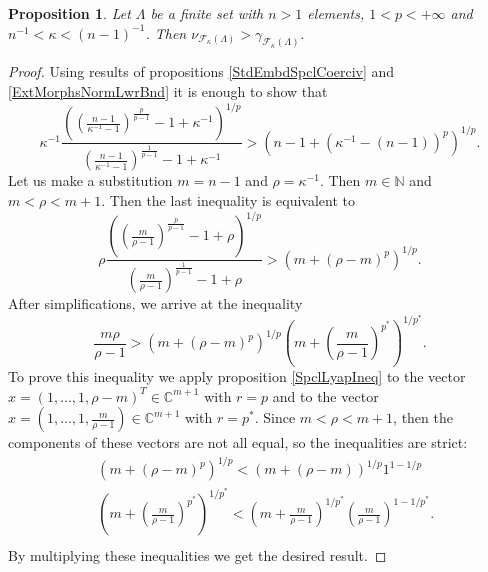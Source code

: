 \documentclass[12pt]{article}
\newtheorem{proposition}[theorem]{Proposition}
\begin{document}
\begin{proposition}\label{CompStdEmbdCoercvAndExtMorphsNormInf}
    Let $\Lambda$ be a finite set with $n>1$ elements, $1<p<+\infty$ 
    and $n^{-1}<\kappa<(n-1)^{-1}$. Then
    $
    \nu_{\mathcal{F}_{\kappa}(\Lambda)}
    >
    \gamma_{\mathcal{F}_{\kappa}(\Lambda)}.
    $
\end{proposition}
\begin{proof}
    Using results of propositions \ref{StdEmbdSpclCoerciv} 
    and \ref{ExtMorphsNormLwrBnd} it is enough to show that
    \[
        \kappa^{-1}
        \frac{
            \left(
                \left(\frac{n-1}{\kappa^{-1}-1}
                \right)^{\frac{p}{p-1}}
                -1+\kappa^{-1}
            \right)^{1/p}
        }{
            \left(\frac{n-1}{\kappa^{-1}-1}
            \right)^{\frac{1}{p-1}}
            -1+\kappa^{-1}
        }
        >
        (n-1+(\kappa^{-1}-(n-1))^p)^{1/p}.
    \]
    Let us make a substitution $m=n-1$ and $\rho=\kappa^{-1}$. 
    Then $m\in\mathbb{N}$ and $m<\rho<m+1$. Then the last inequality is 
    equivalent to
    \[
        \rho
        \frac{
            \left(
                \left(\frac{m}{\rho-1}
                \right)^{\frac{p}{p-1}}
                -1+\rho
            \right)^{1/p}
        }{
            \left(\frac{m}{\rho-1}
            \right)^{\frac{1}{p-1}}
            -1+\rho
        }
        >
        (m+(\rho-m)^p)^{1/p}.
    \] 
    After simplifications, we arrive at the inequality
    \[
        \frac{m\rho}{\rho-1}
        >
        (m+(\rho-m)^p)^{1/p}
        \left(
            m+\left(\frac{m}{\rho-1}\right)^{p^*}
        \right)^{1/p^*}.
    \]
    To prove this inequality we apply proposition \ref{SpclLyapIneq} to the 
    vector $x=(1,\ldots,1,\rho-m)^T\in\mathbb{C}^{m+1}$ with $r=p$ and to the 
    vector $x=(1,\ldots,1,\frac{m}{\rho-1})\in\mathbb{C}^{m+1}$ with $r=p^*$. 
    Since $m<\rho<m+1$, then the components of these vectors are not all equal,
    so the inequalities are strict:
    \[
    \begin{aligned}
        &(m+(\rho-m)^p)^{1/p}
        <
        (m+(\rho-m))^{1/p} 1^{1-1/p}\\
        &\left(m+\left(\frac{m}{\rho-1}\right)^{p^*}\right)^{1/p^*}
        <
        \left(m+\frac{m}{\rho-1}\right)^{1/p^*}
        \left(\frac{m}{\rho-1}\right)^{1-1/p^*}.\\
    \end{aligned}
    \]
    By multiplying these inequalities we get the desired result.
\end{proof}
\end{document}
